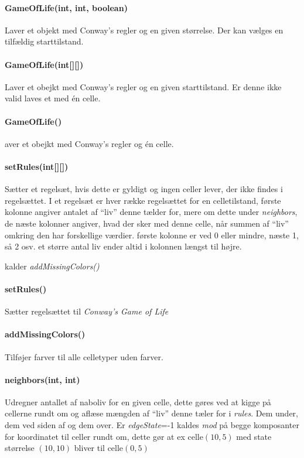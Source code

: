 \paragraph{ GameOfLife(int, int, boolean)} Laver et \gol objekt med Conway's regler og en given størrelse. Der kan vælges en tilfældig starttilstand.

\paragraph{ GameOfLife(int[][]) } Laver et \gol obejkt med Conway's regler og en given starttilstand. Er denne ikke valid laves et \gol med én celle.

\paragraph{GameOfLife()} aver et \gol obejkt med Conway's regler og én celle.

\paragraph{setRules(int[][])} Sætter et regelsæt, hvis dette er gyldigt og ingen celler lever, der ikke findes i regelsættet.
I et regelsæt er hver række regelsættet for en celletilstand, første kolonne angiver antalet af ``liv'' denne tælder for,
mere om dette under \emph{neighbors}, de næste kolonner angiver, hvad der sker med denne celle, når summen af ``liv''
omkring den har forskellige værdier. første kolonne er ved 0 eller mindre, næste 1, så 2 osv. et større antal liv ender altid i kolonnen længst til højre.

kalder \emph{addMissingColors()}

\paragraph{setRules()} Sætter regelsættet til \emph{Conway's Game of Life}

\paragraph{addMissingColors()} Tilføjer farver til alle celletyper uden farver.

\paragraph{neighbors(int, int)} Udregner antallet af naboliv for en given celle,
dette gøres ved at kigge på cellerne rundt om og aflæse mængden af ``liv'' denne tæler for i \emph{rules}.
Dem under, dem ved siden af og dem over. 
Er \emph{edgeState}=-1 kaldes \emph{mod} på begge komposanter for koordinatet til celler rundt om,
dette gør at ex celle$(10, 5)$ med state størrelse $(10, 10)$ bliver til celle$(0, 5)$

